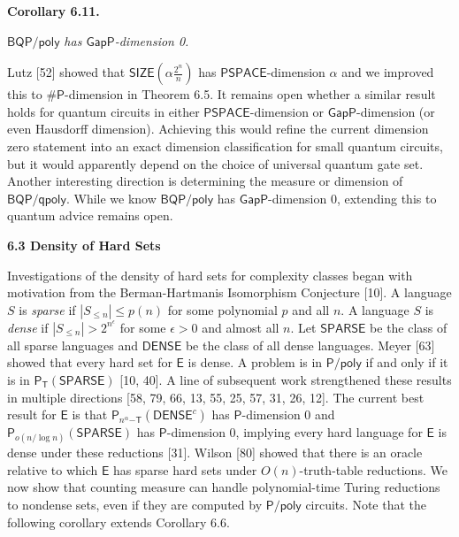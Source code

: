 \documentclass[10pt,a4paper]{article}
\begin{document}


\par\medskip\noindent\textbf{
\textbf{Corollary 6.11}\textbf{.}
}\par



$\mathsf{BQP}/\mathsf{poly}$\emph{ has $\mathsf{GapP}$-dimension 0.}\par






Lutz [52] showed that $\mathsf{SIZE}\!(\alpha\frac{2^{n}}{n})$ has $\mathsf{PSPACE}$-dimension $\alpha$ and we improved this to ${\mathsf{\#}\mathsf{P}}$-dimension in Theorem 6.5. It remains open whether a similar result holds for quantum circuits in either $\mathsf{PSPACE}$-dimension or $\mathsf{GapP}$-dimension (or even Hausdorff dimension). Achieving this would refine the current dimension zero statement into an exact dimension classification for small quantum circuits, but it would apparently depend on the choice of universal quantum gate set.
Another interesting direction is determining the measure or dimension of $\mathsf{BQP}/\mathsf{qpoly}$. While we know $\mathsf{BQP}/\mathsf{poly}$ has $\mathsf{GapP}$-dimension 0, extending this to quantum advice remains open.\par






\par\medskip\noindent\textbf{
6.3 Density of Hard Sets}\par




Investigations of the density of hard sets for complexity classes began with motivation from the Berman-Hartmanis Isomorphism Conjecture [10].
A language $S$ is \emph{sparse} if $|S_{\leq n}|\leq p(n)$ for some polynomial $p$ and all $n$.
A language $S$ is \emph{dense} if $|S_{\leq n}|>2^{n^{\epsilon}}$ for some $\epsilon>0$ and almost all $n$.
Let $\mathsf{SPARSE}$ be the class of all sparse languages and $\mathsf{DENSE}$ be the class of all dense languages.
Meyer [63] showed that every hard set for $\mathsf{E}$ is dense.
A problem is in ${\mathsf{P}/\mathsf{poly}}$ if and only if it is in $\mathsf{P}_{\mathsf{T}}(\mathsf{SPARSE})$ [10, 40].
A line of subsequent work strengthened these results in multiple directions
[58, 79, 66, 13, 55, 25, 57, 31, 26, 12].
The current best result for $\mathsf{E}$ is that
$\mathsf{P}_{n^{\alpha}\mathsf{-T}}(\mathsf{DENSE}^{c})$ has $\mathsf{P}$-dimension 0
and $\mathsf{P}_{o(n/\log n)}(\mathsf{SPARSE})$ has $\mathsf{P}$-dimension 0, implying every hard language for $\mathsf{E}$ is dense under these reductions [31]. Wilson [80] showed that there is an oracle relative to which $\mathsf{E}$ has sparse hard sets under $O(n)$-truth-table reductions.
We now show that counting measure can handle polynomial-time Turing reductions to nondense sets, even if they are computed by ${\mathsf{P}/\mathsf{poly}}$ circuits.
Note that the following corollary extends Corollary 6.6.\par
\end{document}
